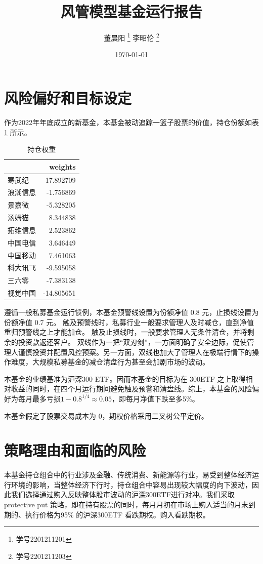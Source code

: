 \documentclass[a4paper,12pt]{ctexart}
\author{董晨阳 \thanks{学号2201211201} 李昭伦 \thanks{学号2201211203}}
\date{\today}
\title{风管模型基金运行报告}
\begin{document}
\maketitle
\tableofcontents
\section{风险偏好和目标设定}
作为2022年年底成立的新基金，本基金被动追踪一篮子股票的价值，持仓份额如表\ref{holdings} 所示。
\begin{table}[ht]
    \centering
    \begin{tabular}{lr}
        \toprule
        {} &    weights \\
        \midrule
        寒武纪  &  17.892709 \\
        浪潮信息 &  -1.756869 \\
        景嘉微  &  -5.328205 \\
        汤姆猫  &   8.344838 \\
        拓维信息 &   2.523862 \\
        中国电信 &   3.646449 \\
        中国移动 &   7.461063 \\
        科大讯飞 &  -9.595058 \\
        三六零  &  -7.383138 \\
        视觉中国 & -14.805651 \\
        \bottomrule
        \end{tabular}
	\caption{持仓权重}
	\label{holdings}
\end{table}

遵循一般私募基金运行惯例，本基金预警线设置为份额净值 0.8 元，止损线设置为份额净值 0.7 元。
触及预警线时，私募行业一般要求管理人及时减仓，直到净值重归预警线之上才能加仓。
触及止损线时，一般要求管理人无条件清仓，并将剩余的投资款返还客户。
双线作为一把“双刃剑”，一方面明确了安全边际，促使管理人谨慎投资并配置风控预案。另一方面，双线也加大了管理人在极端行情下的操作难度，大规模私募基金的减仓清盘行为甚至会加剧市场的波动。

本基金的业绩基准为沪深300 ETF。因而本基金的目标为在 300ETF 之上取得相对收益的同时，在四个月运行期间避免触及预警和清盘线。综上，本基金的风险偏好为每月最多亏损\(1-0.8^{1/4}\approx 0.05\)，即每月净值下跌至多5\%。

本基金假定了股票交易成本为 0，期权价格采用二叉树公平定价。
\section{策略理由和面临的风险}
本基金持仓组合中的行业涉及金融、传统消费、新能源等行业，易受到整体经济运行环境的影响，当整体经济下行时，持仓组合中容易出现较大幅度的向下波动，因此我们选择通过购入反映整体股市波动的沪深300ETF进行对冲。我们采取 protective put 策略，即在持有股票的同时，每月月初在市场上购入适当的月末到期的、执行价格为95\% 的沪深300ETF 看跌期权。购入看跌期权。
\end{document}
